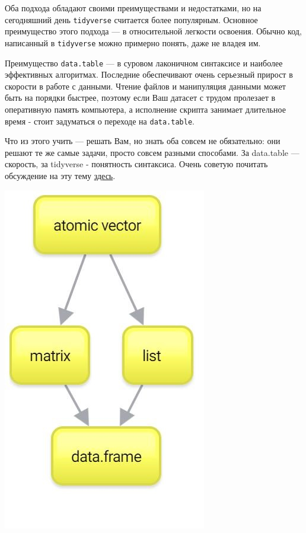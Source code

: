 \documentclass[]{book}
\begin{document}
Оба подхода обладают своими преимуществами и недостатками, но на сегодняшний день \texttt{tidyverse} считается более популярным. Основное преимущество этого подхода --- в относительной легкости освоения. Обычно код, написанный в \texttt{tidyverse} можно примерно понять, даже не владея им.

Преимущество \texttt{data.table} --- в суровом лаконичном синтаксисе и наиболее эффективных алгоритмах. Последние обеспечивают очень серьезный прирост в скорости в работе с данными. Чтение файлов и манипуляция данными может быть на порядки быстрее, поэтому если Ваш датасет с трудом пролезает в оперативную память компьютера, а исполнение скрипта занимает длительное время - стоит задуматься о переходе на \texttt{data.table}.

Что из этого учить --- решать Вам, но знать оба совсем не обязательно: они решают те же самые задачи, просто совсем разными способами. За data.table --- скорость, за tidyverse - понятность синтаксиса. Очень советую почитать обсуждение на эту тему \href{https://stackoverflow.com/questions/21435339/data-table-vs-dplyr-can-one-do-something-well-the-other-cant-or-does-poorly}{здесь}.

\includegraphics{images/New-Mind-Map.jpg}
\end{document}
